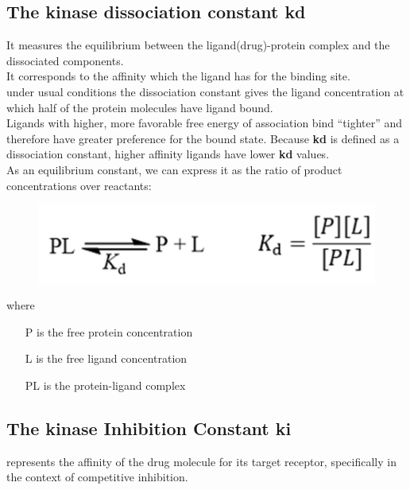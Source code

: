 \documentclass[11pt, a4paper]{article}
\begin{document}
    \subsection{The kinase dissociation constant \textbf{kd}}
        It measures the equilibrium between the ligand(drug)-protein complex and the dissociated components. \\
        It corresponds to the affinity which the ligand has for the binding site. \\
        under usual conditions the dissociation constant gives the ligand concentration at which half of the protein molecules have ligand bound.\\
        Ligands with higher, more favorable free energy of association bind “tighter” and therefore have greater preference for the bound state. Because \textbf{kd} is defined as a dissociation constant, higher affinity ligands have lower \textbf{kd} values.\\ 
        As an equilibrium constant, we can express it as the ratio of product concentrations over reactants:
        \begin{figure}[H]
            \centering
            \begin{minipage}{0.45\textwidth}
            \includegraphics[width=\textwidth]{affinity measurements/kd.png}
            \end{minipage}   
        \end{figure}
        where
        \begin{itemize}
            \item [P] is the free protein concentration
            \item [L] is the free ligand concentration
            \item [PL] is the protein-ligand complex         
        \end{itemize}

    \subsection{The kinase Inhibition Constant \textbf{ki}}
        represents the affinity of the drug molecule for its target receptor, specifically in the context of competitive inhibition.
\end{document}
